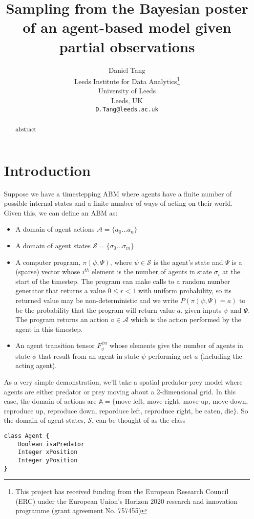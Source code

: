 \documentclass{article}
\title{Sampling from the Bayesian poster of an agent-based model given partial observations}
\author{
  Daniel Tang\\
  Leeds Institute for Data Analytics\thanks{This project has received funding from the European Research Council (ERC) under the European Union’s Horizon 2020 research and innovation programme (grant agreement No. 757455)}\\
  University of Leeds\\
  Leeds, UK\\
  \texttt{D.Tang@leeds.ac.uk} \\
}
\begin{document}
\maketitle

\begin{abstract}
abstract
\end{abstract}


\section{Introduction}


Suppose we have a timestepping ABM where agents have a finite number of possible internal states and a finite number of ways of acting on their world. Given this, we can define an ABM as:
\begin{itemize}
\item A domain of agent actions $\mathcal{A} =\{ a_0 ... a_n \}$

\item A domain of agent states $\mathcal{S} = \{\sigma_0 ... \sigma_m\}$

\item A computer program, $\pi(\psi,\Psi)$,  where $\psi \in \mathcal{S}$ is the agent's state and $\Psi$ is a (sparse) vector whose $i^{th}$ element is the number of agents in state $\sigma_i$ at the start of the timestep. The program can make calls to a random number generator that returns a value $0 \le r < 1$ with uniform probability, so its returned value may be non-deterministic and we write $P(\pi(\psi,\Psi)=a)$ to be the probability that the program will return value $a$, given inputs $\psi$ and $\Psi$. The program returns an action $a \in \mathcal{A}$ which is the action  performed by the agent in this timestep.

\item An agent transition tensor $F_\phi^{\psi a}$ whose elements give the number of agents in state $\phi$ that result from an agent in state $\psi$ performing act $a$ (including the acting agent).
\end{itemize}

As a very simple demonstration, we'll take a spatial predator-prey model where agents are either predator or prey moving about a 2-dimensional grid. In this case, the domain of actions are $\mathbb{A} = \{$move-left, move-right, move-up, move-down, reproduce up, reproduce down, reporduce left, reproduce right, be eaten, die$\}$. So the domain of agent states, $\mathcal{S}$, can be thought of as the class 
\begin{lstlisting}
class Agent {
	Boolean	isaPredator
	Integer	xPosition
	Integer	yPosition
}
\end{lstlisting}
\end{document}
